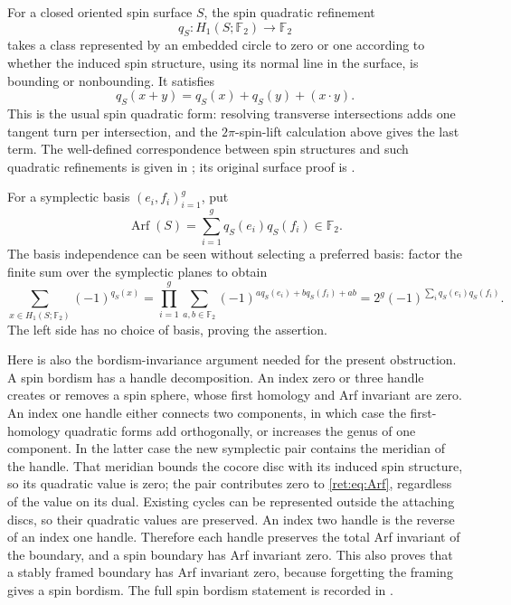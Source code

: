\documentclass[11pt,letterpaper]{article}
\numberwithin{equation}{section}
\theoremstyle{definition}
\theoremstyle{remark}
\begin{document}
For a closed oriented spin surface \(S\), the spin quadratic
refinement
\[
 q_S:H_1(S;\mathbb F_2)\longrightarrow\mathbb F_2
\]
takes a class represented by an embedded circle to zero or one
according to whether the induced spin structure, using its normal
line in the surface, is bounding or nonbounding.  It satisfies
\begin{equation}
 q_S(x+y)=q_S(x)+q_S(y)+(x\mathbin{\cdot}y).
 \label{ret:eq:quadratic}
\end{equation}
This is the usual spin quadratic form: resolving transverse
intersections adds one tangent turn per intersection, and the
\(2\pi\)-spin-lift calculation above gives the last term.  The
well-defined correspondence between spin structures and such
quadratic refinements is given in
\cite[Theorem 3.2 and Remark 3.3]{retbib:DebrayGunningham}; its original
surface proof is \cite{retbib:Johnson}.

For a symplectic basis \((e_i,f_i)_{i=1}^g\), put
\begin{equation}
 \operatorname{Arf}(S)=\sum_{i=1}^gq_S(e_i)q_S(f_i)\in\mathbb F_2.
 \label{ret:eq:Arf}
\end{equation}
The basis independence can be seen without selecting a preferred
basis: factor the finite sum over the symplectic planes to obtain
\[
 \sum_{x\in H_1(S;\mathbb F_2)}(-1)^{q_S(x)}
   =\prod_{i=1}^g
     \sum_{a,b\in\mathbb F_2}(-1)^{a q_S(e_i)+b q_S(f_i)+ab}
   =2^g(-1)^{\sum_i q_S(e_i)q_S(f_i)}.
\]
The left side has no choice of basis, proving the assertion.

Here is also the bordism-invariance argument needed for the present
obstruction.  A spin bordism has a handle decomposition.  An index
zero or three handle creates or removes a spin sphere, whose first
homology and Arf invariant are zero.  An index one handle either
connects two components, in which case the first-homology quadratic
forms add orthogonally, or increases the genus of one component.
In the latter case the new symplectic pair contains the meridian
of the handle.  That meridian bounds the cocore disc with its
induced spin structure, so its quadratic value is zero; the pair
contributes zero to \eqref{ret:eq:Arf}, regardless of the value on its
dual.  Existing cycles can be represented outside the attaching
discs, so their quadratic values are preserved.  An index two
handle is the reverse of an index one handle.  Therefore each
handle preserves the total Arf invariant of the boundary, and a
spin boundary has Arf invariant zero.  This also proves that a
stably framed boundary has Arf invariant zero, because forgetting
the framing gives a spin bordism.  The full spin bordism statement
is recorded in \cite[Theorem 3.6]{retbib:DebrayGunningham}.
\end{document}
